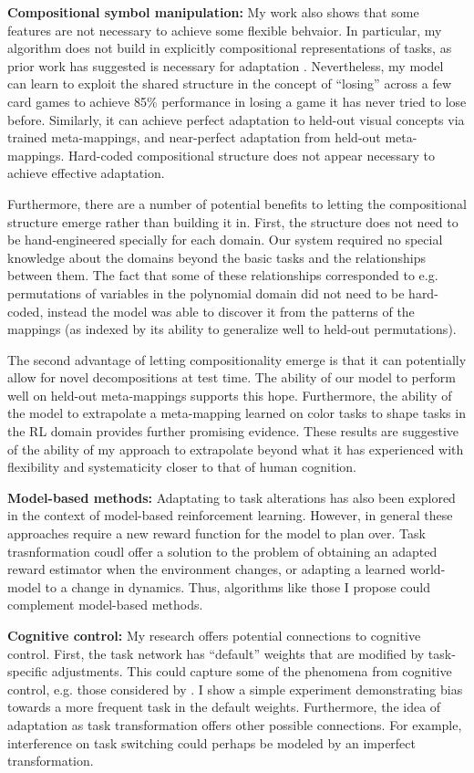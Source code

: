 \documentclass[12pt]{article}
\begin{document}
\textbf{Compositional symbol manipulation:}
My work also shows that some features are not necessary to achieve some flexible behvaior. In particular, my algorithm does not build in explicitly compositional representations of tasks, as prior work has suggested is necessary for adaptation \citep[e.g.]{Lake2017}. Nevertheless, my model can learn to exploit the shared structure in the concept of ``losing'' across a few card games to achieve 85\% performance in losing a game it has never tried to lose before. Similarly, it can achieve perfect adaptation to held-out visual concepts via trained meta-mappings, and near-perfect adaptation from held-out meta-mappings. Hard-coded compositional structure does not appear necessary to achieve effective adaptation.

Furthermore, there are a number of potential benefits to letting the compositional structure emerge rather than building it in. First, the structure does not need to be hand-engineered specially for each domain. Our system required no special knowledge about the domains beyond the basic tasks and the relationships between them. The fact that some of these relationships corresponded to e.g. permutations of variables in the polynomial domain did not need to be hard-coded, instead the model was able to discover it from the patterns of the mappings (as indexed by its ability to generalize well to held-out permutations).

The second advantage of letting compositionality emerge is that it can potentially allow for novel decompositions at test time. The ability of our model to perform well on held-out meta-mappings supports this hope. Furthermore, the ability of the model to extrapolate a meta-mapping learned on color tasks to shape tasks in the RL domain provides further promising evidence. These results are suggestive of the ability of my approach to extrapolate beyond what it has experienced with flexibility and systematicity closer to that of human cognition.

\textbf{Model-based methods:} 
Adaptating to task alterations has also been explored in the context of model-based reinforcement learning. However, in general these approaches require a new reward function for the model to plan over. Task trasnformation coudl offer a solution to the problem of obtaining an adapted reward estimator when the environment changes, or adapting a learned world-model to a change in dynamics. Thus, algorithms like those I propose could complement model-based methods. 

\textbf{Cognitive control:} My research offers potential connections to cognitive control. First, the task network has ``default'' weights that are modified by task-specific adjustments. This could capture some of the phenomena from cognitive control, e.g. those considered by \citet{Cohen1990}. I show a simple experiment demonstrating bias towards a more frequent task in the default weights. Furthermore, the idea of adaptation as task transformation offers other possible connections. For example, interference on task switching could perhaps be modeled by an imperfect transformation.
\end{document}
